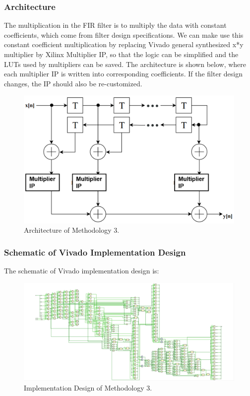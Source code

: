 \documentclass[a4paper]{article}
\begin{document}
\subsubsection{Architecture}
The multiplication in the FIR filter is to multiply the data with constant coefficients, which come from filter design specifications. We can make use this constant coefficient multiplication by replacing Vivado general synthesized x*y multiplier by Xilinx Multiplier IP, so that the logic can be simplified and the LUTs used by multipliers can be saved. The architecture is shown below, where each multiplier IP is written into corresponding coefficients. If the filter design changes, the IP should also be re-customized.
\begin{figure}[H]
    \centering
    \includegraphics[width=1\textwidth]{part4_3_1.png}
    \caption{Architecture of Methodology 3.}
\end{figure}

\subsubsection{Schematic of Vivado Implementation Design}
The schematic of Vivado implementation design is:
\begin{figure}[H]
    \centering
    \includegraphics[width=1\textwidth]{part4_3_2.png}
    \caption{Implementation Design of Methodology 3.}
\end{figure}
\end{document}
